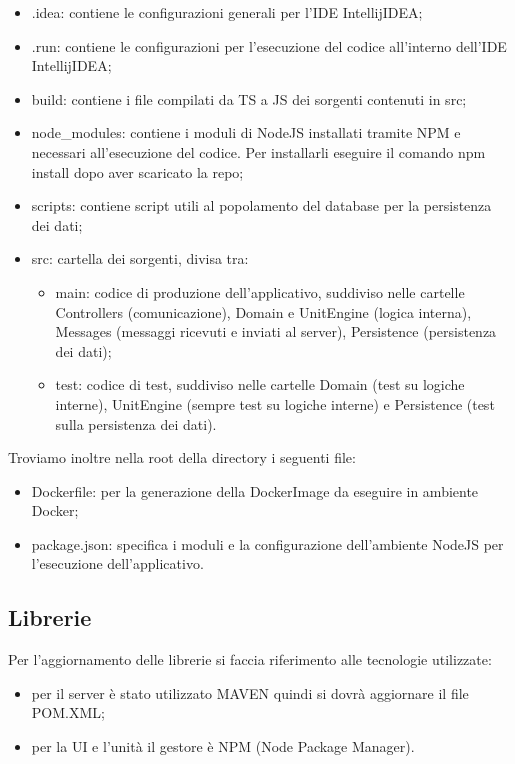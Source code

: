 	\begin{itemize}
		\item{.idea}: contiene le configurazioni generali per l'IDE IntellijIDEA;
		\item{.run}: contiene le configurazioni per l'esecuzione del codice all'interno dell'IDE IntellijIDEA;
		\item{build}: contiene i file compilati da TS a JS dei sorgenti contenuti in src;
		\item{node\_modules}: contiene i moduli di NodeJS installati tramite NPM e	necessari all'esecuzione del codice. Per installarli eseguire il comando npm install dopo aver scaricato la repo;
		\item{scripts}: contiene script utili al popolamento del database per la persistenza dei dati;
		\item{src}: cartella dei sorgenti, divisa tra:
		\begin{itemize}
			\item{main}: codice di produzione dell'applicativo, suddiviso nelle cartelle Controllers (comunicazione), Domain e UnitEngine (logica interna), Messages (messaggi ricevuti e inviati al server), Persistence (persistenza dei dati);
			\item{test}: codice di test, suddiviso nelle cartelle Domain (test su logiche interne),	UnitEngine (sempre test su logiche interne) e Persistence (test sulla persistenza dei dati).
		\end{itemize}
	\end{itemize}
	
	Troviamo inoltre nella root della directory i seguenti file:
	\begin{itemize}
		\item{Dockerfile}: per la generazione della DockerImage da eseguire in ambiente Docker;
		\item{package.json}: specifica i moduli e la configurazione dell'ambiente NodeJS per l'esecuzione dell'applicativo.
	\end{itemize}
	
\subsection{Librerie}
	Per l'aggiornamento delle librerie si faccia riferimento alle tecnologie utilizzate:
	\begin{itemize}
		\item{} per il server è stato utilizzato MAVEN quindi si dovrà aggiornare il file POM.XML;
		\item{} per la UI e l'unità il gestore è NPM (Node Package Manager).
	\end{itemize}
